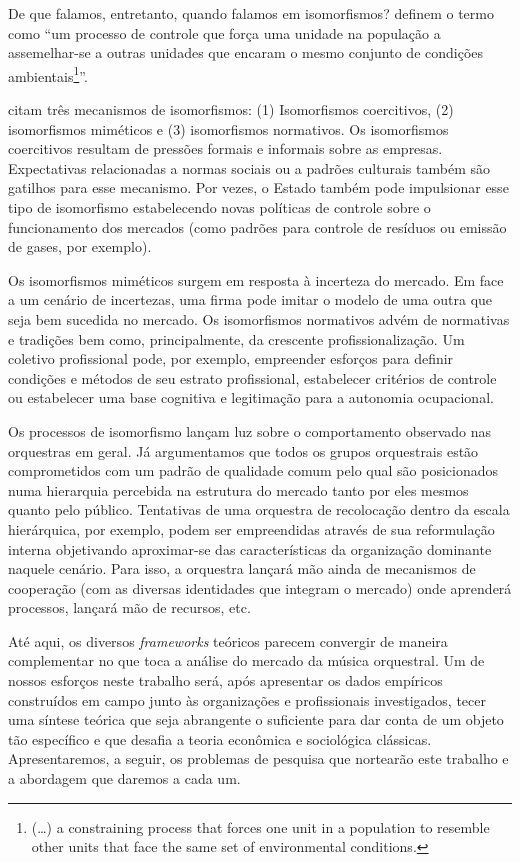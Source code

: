 \documentclass[a4paper, 12pt, openright, oneside, german, french, english, brazil]{abntex2}
\begin{document}
	De que falamos, entretanto, quando falamos em isomorfismos?  definem o termo como ``um processo de controle que força uma unidade na população a assemelhar-se a outras unidades que encaram o mesmo conjunto de condições ambientais\footnote{(\dots) a constraining process that forces one unit in a population to resemble other units that face the same set of environmental conditions.}''.
	
	 citam três mecanismos de isomorfismos: (1) Isomorfismos coercitivos, (2) isomorfismos miméticos e (3) isomorfismos normativos. Os isomorfismos coercitivos resultam de pressões formais e informais sobre as empresas. Expectativas relacionadas a normas sociais ou a padrões culturais também são gatilhos para esse mecanismo. Por vezes, o Estado também pode impulsionar esse tipo de isomorfismo estabelecendo novas políticas de controle sobre o funcionamento dos mercados (como padrões para controle de resíduos ou emissão de gases, por exemplo). 
	
	Os isomorfismos miméticos surgem em resposta à incerteza do mercado. Em face a um cenário de incertezas, uma firma pode imitar o modelo de uma outra que seja bem sucedida no mercado. Os isomorfismos normativos advém de normativas e tradições bem como, principalmente, da crescente profissionalização. Um coletivo profissional pode, por exemplo, empreender esforços para definir condições e métodos de seu estrato profissional, estabelecer critérios de controle ou estabelecer uma base cognitiva e legitimação para a autonomia ocupacional.
	
	Os processos de isomorfismo lançam luz sobre o comportamento observado nas orquestras em geral. Já argumentamos que todos os grupos orquestrais estão comprometidos com um padrão de qualidade comum pelo qual são posicionados numa hierarquia percebida na estrutura do mercado tanto por eles mesmos quanto pelo público. Tentativas de uma orquestra de recolocação dentro da escala hierárquica, por exemplo, podem ser empreendidas através de sua reformulação interna objetivando aproximar-se das características da organização dominante naquele cenário. Para isso, a orquestra lançará mão ainda de mecanismos de cooperação (com as diversas identidades que integram o mercado) onde aprenderá processos, lançará mão de recursos, etc.
	
	Até aqui, os diversos \textit{frameworks} teóricos parecem convergir de maneira complementar no que toca a análise do mercado da música orquestral. Um de nossos esforços neste trabalho será, após apresentar os dados empíricos construídos em campo junto às organizações e profissionais investigados, tecer uma síntese teórica que seja abrangente o suficiente para dar conta de um objeto tão específico e que desafia a teoria econômica e sociológica clássicas. Apresentaremos, a seguir, os problemas de pesquisa que nortearão este trabalho e a abordagem que daremos a cada um.
	
\end{document}
